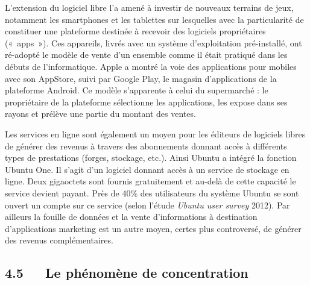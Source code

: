 \documentclass{FramateX}
\begin{document}
\begin{refsection}
L'extension du logiciel libre l'a amené à investir de nouveaux
terrains de jeux, notamment les smartphones et les tablettes sur
lesquelles avec la particularité de constituer une plateforme destinée
à recevoir des logiciels propriétaires («~apps~»). Ces
appareils, livrés avec un système d'exploitation pré-installé, ont
ré-adopté le modèle de vente d'un ensemble comme il était pratiqué dans
les débuts de l'informatique. Apple a montré la voie des applications
pour mobiles avec son AppStore, suivi par Google Play, le magasin
d'applications de la plateforme Android. Ce modèle s'apparente à celui
du supermarché : le propriétaire de la plateforme sélectionne les
applications, les expose dans ses rayons et prélève une partie du
montant des ventes.

Les services en ligne sont également un moyen pour les éditeurs de
logiciels libres de générer des revenus à travers des abonnements
donnant accès à différents types de prestations (forges, stockage,
etc.). Ainsi Ubuntu a intégré la fonction Ubuntu One. Il s'agit d'un
logiciel donnant accès à un service de stockage en ligne. Deux
gigaoctets sont fournis gratuitement et au-delà de cette capacité le
service devient payant. Près de 40\% des utilisateurs du système Ubuntu
se sont ouvert un compte sur ce service (selon l'étude \textit{Ubuntu
user survey} 2012).
Par ailleurs la fouille de données et la vente
d'informations à destination d'applications marketing est un autre
moyen, certes plus controversé, de générer des revenus
complémentaires.

\subsection*{4.5~~~Le phénomène de concentration}
{}


\end{refsection}
\end{document}
